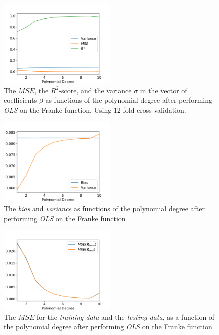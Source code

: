 \documentclass[a4paper,10pt,english]{article}
\begin{document}
\begin{multicols*}{2}
\begin{figure}[H]
	\centering 
	\includegraphics[width = 0.5\textwidth, center]{../franke_output/part_B.png}
	\caption{The $MSE$, the $R^2$-score, and the variance $\sigma$ in the vector of coefficients $\beta$ as functions of the polynomial degree after performing \textit{OLS} on the Franke function.  Using 12-fold cross validation.}
	\label{fig_5}
\end{figure}

\begin{figure}[H]
	\centering 
	\includegraphics[width = 0.5\textwidth, center]{../franke_output/part_C_1.png}
	\caption{The \textit{bias} and \textit{variance} as functions of the polynomial degree after performing \textit{OLS} on the Franke function}
	\label{fig_6}
\end{figure}

\begin{figure}[H]
	\centering 
	\includegraphics[width = 0.5\textwidth, center]{../franke_output/part_C_2.png}
	\caption{The $MSE$ for the \textit{training data} and the \textit{testing data}, as a function of the polynomial degree after performing \textit{OLS} on the Franke function}
	\label{fig_7}
\end{figure}


\end{multicols*}
\end{document}

